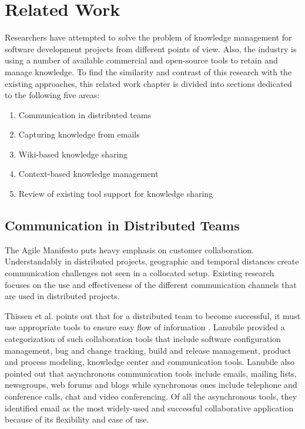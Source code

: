 \fancyhead[RO,LE]{\thepage}
\fancyfoot{} 
\chapter{Related Work}
\label{ch:related_work}
Researchers have attempted to solve the problem of knowledge management for software development projects from different points of view. Also, the industry is using a number of available commercial and open-source tools to retain and manage knowledge. To find the similarity and contrast of this research with the existing approaches, this related work chapter is divided into sections dedicated to the following five areas:

\begin{enumerate}
	\item Communication in distributed teams
	\item Capturing knowledge from emails
	\item Wiki-based knowledge sharing
	\item Context-based knowledge management
	\item Review of existing tool support for knowledge sharing
\end{enumerate}

\section{Communication in Distributed Teams}
The Agile Manifesto \cite{am} puts heavy emphasis on customer collaboration. Understandably in distributed projects, geographic and temporal distances create communication challenges not seen in a collocated setup. Existing research focuses on the use and effectiveness of the different communication channels that are used in distributed projects.

Thissen et al. points out that for a distributed team to become successful, it must use appropriate tools to ensure easy flow of information \cite{communication_tools}. Lanubile provided a categorization of such collaboration tools \cite{communication_in_distributed} that include software configuration management, bug and change tracking, build and release management, product and process modeling, knowledge center and communication tools. Lanubile also pointed out that asynchronous communication tools include emails, mailing lists, newsgroups, web forums and blogs while synchronous ones include telephone and conference calls, chat and video conferencing. Of all the asynchronous tools, they identified email as the most widely-used and successful collaborative application because of its flexibility and ease of use.


